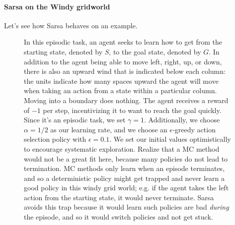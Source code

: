 \documentclass[12pt]{article}
\begin{document}
\paragraph{Sarsa on the Windy gridworld}
Let's see how Sarsa behaves on an example.
\begin{figure}[h]
  \centering
  \caption{\footnotesize In this episodic task, an agent seeks to learn how to get from the starting state, denoted by $S$, to the goal state, denoted by $G$. In addition to the agent being able to move left, right, up, or down, there is also an upward wind that is indicated below each column: the units indicate how many spaces upward the agent will move when taking an action from a state within a particular column. Moving into a boundary does nothing. The agent receives a reward of $-1$ per step, incentivizing it to want to reach the goal quickly. Since it's an episodic task, we set $\gamma = 1$. Additionally, we choose $\alpha = 1/2$ as our learning rate, and we choose an $\epsilon$-greedy action selection policy with $\epsilon = 0.1$. We set our initial values optimistically to encourage systematic exploration. Realize that a MC method would not be a great fit here, because many policies do not lead to termination. MC methods only learn when an episode terminates, and so a deterministic policy might get trapped and never learn a good policy in this windy grid world; e.g. if the agent takes the left action from the starting state, it would never terminate. Sarsa avoids this trap because it would learn such policies are bad \emph{during} the episode, and so it would switch policies and not get stuck.}
\end{figure}
\end{document}
